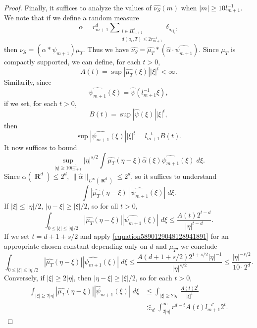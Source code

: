 \documentclass[12pt,reqno]{amsart}
\DeclareMathOperator{\RR}{\mathbf{R}}
\begin{document}
\begin{proof}
    Finally, it suffices to analyze the values of $\widehat{\nu_S}(m)$ when $|m| \geq 10 l_{m+1}^{-1}$. We note that if we define a random measure
    \[ \alpha = r_{m+1}^d \sum\nolimits_{\substack{i \in \Pi_{m+1}^d\\d(a_i,T) \leq 2 r_{m+1}^{-1}}} \delta_{a_{ij_i}}, \]
    then $\nu_S = (\alpha * \psi_{m+1}) \mu_T$.
    Thus we have $\widehat{\nu_S} = \widehat{\mu_T} * (\widehat{\alpha} \cdot \widehat{\psi_{m+1}})$. Since $\mu_T$ is compactly supported, we can define, for each $t > 0$,
    \[ A(t) = \sup |\widehat{\mu_T}(\xi)| |\xi|^t < \infty. \]
    Similarily, since
    \[ \widehat{\psi_{m+1}}(\xi) = \widehat{\psi} \left( l_{m+1}^{-1} \xi \right), \]
    if we set, for each $t > 0$,
    \[ B(t) = \sup |\widehat{\psi}(\xi)| |\xi|^t, \]
    then
    \[ \sup |\widehat{\psi_{m+1}}(\xi)| |\xi|^t = l_{m+1}^{-t} B(t). \]
    It now suffices to bound
    \[ \sup_{|\eta| \geq 10 l_{m+1}^{-1}} |\eta|^{s/2} \int \widehat{\mu_T}(\eta - \xi) \widehat{\alpha}(\xi) \widehat{\psi_{m+1}}(\xi)\; d\xi. \]
    Since $\alpha(\RR^d) \leq 2^d$, $\| \widehat{\alpha} \|_{L^\infty(\RR^d)} \leq 2^d$, so it suffices to understand
    \[ \int |\widehat{\mu_T}(\eta - \xi)| |\widehat{\psi_{m+1}}(\xi)|\; d\xi. \]
    If $|\xi| \leq |\eta|/2$, $|\eta - \xi| \geq |\xi|/2$, so for all $t > 0$,
    \[ \int_{0 \leq |\xi| \leq |\eta|/2} |\widehat{\mu_T}(\eta - \xi)| |\widehat{\psi_{m+1}}(\xi)|\; d\xi \leq \frac{A(t) 2^{t-d}}{|\eta|^{t-d}}. \]
    If we set $t = d + 1 + s/2$ and apply \eqref{equation5890129048128941891} for an appropriate chosen constant depending only on $d$ and $\mu_T$, we conclude
    \[ \int_{0 \leq |\xi| \leq |\eta|/2} |\widehat{\mu_T}(\eta - \xi)| |\widehat{\psi_{m+1}}(\xi)|\; d\xi \leq \frac{A(d + 1 + s/2) 2^{1 + s/2} |\eta|^{-1}}{|\eta|^{s/2}} \leq \frac{|\eta|^{-s/2}}{10 \cdot 2^d}. \]
    Conversely, if $|\xi| \geq 2|\eta|$, then $|\eta - \xi| \geq |\xi|/2$, so for each $t > 0$,
    \begin{align*}
        \int_{|\xi| \geq 2|\eta|} |\widehat{\mu_T}(\eta - \xi)| |\widehat{\psi}_{m+1}(\xi)|\; d\xi &\leq \int_{|\xi| \geq 2|\eta|} \frac{A(t) 2^t}{|\xi|^t}\\
        &\lesssim_d \int_{2|\eta|}^\infty r^{d - t} A(t) l_{m+1}^{-t'} 2^t.
    \end{align*}

\end{proof}
\end{document}
